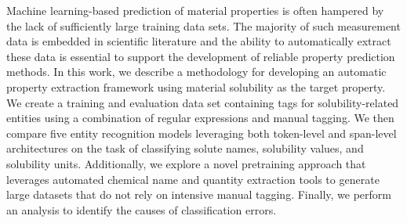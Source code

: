 Machine learning-based prediction of material properties is often hampered by the lack of sufficiently large training data sets. The majority of such measurement data is embedded in scientific literature and the ability to automatically extract these data is essential to support the development of reliable property prediction methods. In this work, we describe a methodology for developing an automatic property extraction framework using material solubility as the target property. We create a training and evaluation data set containing tags for solubility-related entities using a combination of regular expressions and manual tagging. We then compare five entity recognition models leveraging both token-level and span-level architectures on the task of classifying solute names, solubility values, and solubility units. Additionally, we explore a novel pretraining approach that leverages automated chemical name and quantity extraction tools to generate large datasets that do not rely on intensive manual tagging. Finally, we perform an analysis to identify the causes of classification errors.
